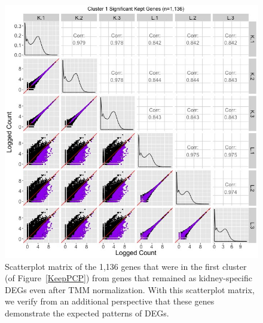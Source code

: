 \documentclass{article}
\begin{document}
\null
\begin{figure}[t!]
\centerline{\includegraphics[width=1\columnwidth]{../Bioinformatics/Pictures/liverKidney/Clustering_data_FDR_001_TMMvRaw_Keep/K_L_Sig_SM_Keep_8_1.jpg}}
\caption{Scatterplot matrix of the 1,136 genes that were in the first cluster (of Figure~\ref{KeepPCP}) from genes that remained as kidney-specific DEGs even after TMM normalization. With this scatterplot matrix, we verify from an additional perspective that these genes demonstrate the expected patterns of DEGs.
\label{KeepSM}}
\end{figure}
\end{document}
